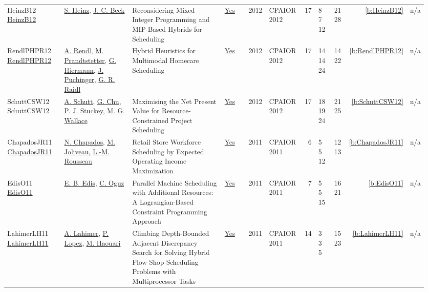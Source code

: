 {\begin{longtable}{>{\raggedright\arraybackslash}p{3cm}>{\raggedright\arraybackslash}p{4.5cm}>{\raggedright\arraybackslash}p{6.0cm}rrrp{2.5cm}rp{1cm}p{1cm}rr}
HeinzB12 \href{https://doi.org/10.1007/978-3-642-29828-8_14}{HeinzB12} & \hyperref[auth:a133]{S. Heinz}, \hyperref[auth:a89]{J. C. Beck} & Reconsidering Mixed Integer Programming and MIP-Based Hybrids for Scheduling & \href{../works/HeinzB12.pdf}{Yes} & \cite{HeinzB12} & 2012 & CPAIOR 2012 & 17 & 8 7 12 & 21 28 & \ref{b:HeinzB12} & n/a\\
RendlPHPR12 \href{https://doi.org/10.1007/978-3-642-29828-8_22}{RendlPHPR12} & \hyperref[auth:a338]{A. Rendl}, \hyperref[auth:a339]{M. Prandtstetter}, \hyperref[auth:a340]{G. Hiermann}, \hyperref[auth:a341]{J. Puchinger}, \hyperref[auth:a342]{G. R. Raidl} & \cellcolor{green!10}Hybrid Heuristics for Multimodal Homecare Scheduling & \href{../works/RendlPHPR12.pdf}{Yes} & \cite{RendlPHPR12} & 2012 & CPAIOR 2012 & 17 & 14 14 24 & 14 22 & \ref{b:RendlPHPR12} & n/a\\
SchuttCSW12 \href{https://doi.org/10.1007/978-3-642-29828-8_24}{SchuttCSW12} & \hyperref[auth:a124]{A. Schutt}, \hyperref[auth:a343]{G. Chu}, \hyperref[auth:a125]{P. J. Stuckey}, \hyperref[auth:a117]{M. G. Wallace} & Maximising the Net Present Value for Resource-Constrained Project Scheduling & \href{../works/SchuttCSW12.pdf}{Yes} & \cite{SchuttCSW12} & 2012 & CPAIOR 2012 & 17 & 18 19 24 & 21 25 & \ref{b:SchuttCSW12} & n/a\\
ChapadosJR11 \href{https://doi.org/10.1007/978-3-642-21311-3_7}{ChapadosJR11} & \hyperref[auth:a344]{N. Chapados}, \hyperref[auth:a345]{M. Joliveau}, \hyperref[auth:a326]{L.-M. Rousseau} & Retail Store Workforce Scheduling by Expected Operating Income Maximization & \href{../works/ChapadosJR11.pdf}{Yes} & \cite{ChapadosJR11} & 2011 & CPAIOR 2011 & 6 & 5 5 12 & 12 13 & \ref{b:ChapadosJR11} & n/a\\
EdisO11 \href{https://doi.org/10.1007/978-3-642-21311-3_10}{EdisO11} & \hyperref[auth:a346]{E. B. Edis}, \hyperref[auth:a347]{C. Oguz} & Parallel Machine Scheduling with Additional Resources: {A} Lagrangian-Based Constraint Programming Approach & \href{../works/EdisO11.pdf}{Yes} & \cite{EdisO11} & 2011 & CPAIOR 2011 & 7 & 5 5 15 & 16 21 & \ref{b:EdisO11} & n/a\\
LahimerLH11 \href{https://doi.org/10.1007/978-3-642-21311-3_12}{LahimerLH11} & \hyperref[auth:a349]{A. Lahimer}, \hyperref[auth:a3]{P. Lopez}, \hyperref[auth:a350]{M. Haouari} & \cellcolor{green!10}Climbing Depth-Bounded Adjacent Discrepancy Search for Solving Hybrid Flow Shop Scheduling Problems with Multiprocessor Tasks & \href{../works/LahimerLH11.pdf}{Yes} & \cite{LahimerLH11} & 2011 & CPAIOR 2011 & 14 & 3 3 5 & 15 23 & \ref{b:LahimerLH11} & n/a\\

\end{longtable}}
